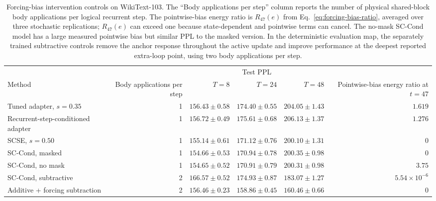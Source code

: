 \documentclass[letterpaper]{article} %
\newcommand{\SCSE}{\textsc{SCSE}}
\theoremstyle{remark}
\begin{document}
\begin{table}[t!]
	\centering
	\scriptsize
	\begin{tabular}{lrrrrr}
		\toprule
		                                   &                            & \multicolumn{3}{c}{Test PPL} &                                                                                             \\
		\cmidrule(lr){3-5}
		Method                             & Body applications per step & $T=8$                        & $T=24$                   & $T=48$                   & Pointwise-bias energy ratio at $t=47$ \\
		\midrule
		Tuned adapter, $s=0.35$            & 1                          & $156.43\pm0.58$              & $174.40\pm0.55$          & $204.05\pm1.43$          & $1.619$                               \\
		Recurrent-step-conditioned adapter & 1                          & $156.72\pm0.49$              & $175.61\pm0.68$          & $206.13\pm1.37$          & $1.276$                               \\
		\SCSE{}, $s=0.50$                  & 1                          & $155.14\pm0.61$              & $171.12\pm0.76$          & $200.10\pm1.31$          & $0$                                   \\
		SC-Cond, masked                    & 1                          & $154.66\pm0.53$              & $170.94\pm0.78$          & $200.35\pm0.98$          & $0$                                   \\
		SC-Cond, no mask                   & 1                          & $\mathbf{154.65\pm0.52}$     & $170.91\pm0.79$          & $200.31\pm0.98$          & $3.75$                                \\
		SC-Cond, subtractive               & 2                          & $166.57\pm0.52$              & $174.93\pm0.87$          & $183.07\pm1.27$          & $5.54\times 10^{-6}$                  \\
		Additive + forcing subtraction     & 2                          & $156.46\pm0.23$              & $\mathbf{158.86\pm0.45}$ & $\mathbf{160.46\pm0.66}$ & $0$                                   \\
		\bottomrule
	\end{tabular}
	\caption{Forcing-bias intervention controls on WikiText-103.  The ``Body applications per step'' column reports the number of physical shared-block body applications per logical recurrent step.  The pointwise-bias energy ratio is $R_{47}(e)$ from Eq.~\ref{eq:forcing-bias-ratio}, averaged over three stochastic replications; $R_{47}(e)$ can exceed one because state-dependent and pointwise terms can cancel.  The no-mask SC-Cond model has a large measured pointwise bias but similar PPL to the masked version.  In the deterministic evaluation map, the separately trained subtractive controls remove the anchor response throughout the active update and improve performance at the deepest reported extra-loop point, using two body applications per step.}
	\label{tab:add-causal-forcing}
\end{table}
\end{document}
